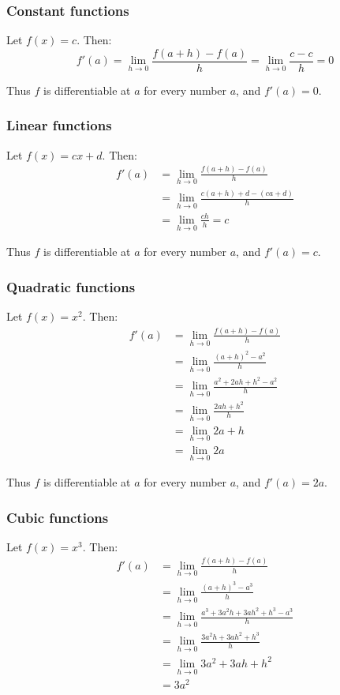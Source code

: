 \subsubsection*{Constant functions}
Let $f(x)=c$. Then:
\[f'(a)=\lim_{h\to0}\frac{f(a+h)-f(a)}{h}=\lim_{h\to0}\frac{c-c}{h}=0\]

Thus $f$ is differentiable at $a$ for every number $a$, and $f'(a)=0$.

\subsubsection*{Linear functions}
Let $f(x)=cx+d$. Then:
\begin{align*}
  f'(a)&=\lim_{h\to0}\frac{f(a+h)-f(a)}{h}\\
       &=\lim_{h\to0}\frac{c(a+h)+d-(ca+d)}{h}\\
       &=\lim_{h\to0}\frac{ch}{h}=c
\end{align*}

Thus $f$ is differentiable at $a$ for every number $a$, and $f'(a)=c$.

\subsubsection*{Quadratic functions}
Let $f(x)=x^2$. Then:
\begin{align*}
  f'(a)&=\lim_{h\to0}\frac{f(a+h)-f(a)}{h}\\
       &=\lim_{h\to0}\frac{(a+h)^2-a^2}{h}\\
       &=\lim_{h\to0}\frac{a^2+2ah+h^2-a^2}{h}\\
       &=\lim_{h\to0}\frac{2ah+h^2}{h}\\
       &=\lim_{h\to0}2a+h\\
       &=\lim_{h\to0}2a
\end{align*}

Thus $f$ is differentiable at $a$ for every number $a$, and $f'(a)=2a$.

\subsubsection*{Cubic functions}
Let $f(x)=x^3$. Then:
\begin{align*}
  f'(a)&=\lim_{h\to0}\frac{f(a+h)-f(a)}{h}\\
       &=\lim_{h\to0}\frac{(a+h)^3-a^3}{h}\\
       &=\lim_{h\to0}\frac{a^3+3a^2h+3ah^2+h^3-a^3}{h}\\
       &=\lim_{h\to0}\frac{3a^2h+3ah^2+h^3}{h}\\
       &=\lim_{h\to0}3a^2+3ah+h^2\\
       &=3a^2
\end{align*}

